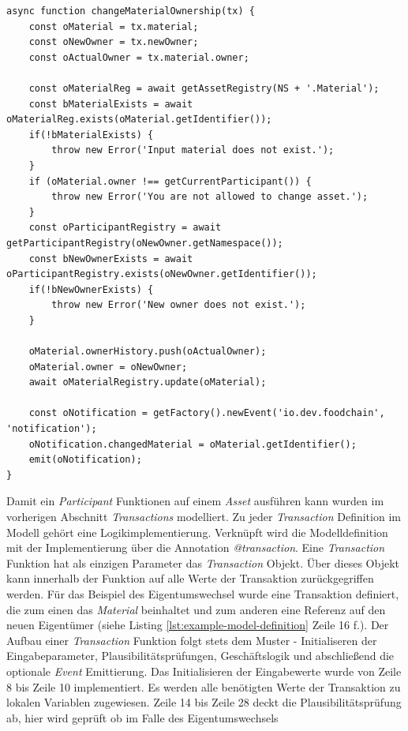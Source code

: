 \begin{lstlisting}[caption={Transaction Processor Function \textit{changeMaterialOwnership(tx)}},language=ES6,label=lst:transaction-logic-change-ownership]
async function changeMaterialOwnership(tx) {
    const oMaterial = tx.material;
    const oNewOwner = tx.newOwner;
    const oActualOwner = tx.material.owner;

    const oMaterialReg = await getAssetRegistry(NS + '.Material');
    const bMaterialExists = await oMaterialReg.exists(oMaterial.getIdentifier());
    if(!bMaterialExists) {
        throw new Error('Input material does not exist.');
    }
    if (oMaterial.owner !== getCurrentParticipant()) {
        throw new Error('You are not allowed to change asset.');
    }
    const oParticipantRegistry = await getParticipantRegistry(oNewOwner.getNamespace());
    const bNewOwnerExists = await oParticipantRegistry.exists(oNewOwner.getIdentifier());
    if(!bNewOwnerExists) {
        throw new Error('New owner does not exist.');
    }

    oMaterial.ownerHistory.push(oActualOwner);
    oMaterial.owner = oNewOwner;
    await oMaterialRegistry.update(oMaterial);

    const oNotification = getFactory().newEvent('io.dev.foodchain', 'notification');
    oNotification.changedMaterial = oMaterial.getIdentifier();
    emit(oNotification);
}
\end{lstlisting}

\noindent
Damit ein \textit{Participant} Funktionen auf einem \textit{Asset} ausführen kann wurden im vorherigen Abschnitt \textit{Transactions} modelliert. Zu jeder \textit{Transaction} Definition im Modell gehört eine Logikimplementierung. Verknüpft wird die Modelldefinition mit der Implementierung über die Annotation \textit{@transaction}. Eine \textit{Transaction} Funktion hat als einzigen Parameter das \textit{Transaction} Objekt. Über dieses Objekt kann innerhalb der Funktion auf alle Werte der Transaktion zurückgegriffen werden. Für das Beispiel des Eigentumswechsel wurde eine Transaktion definiert, die zum einen das \textit{Material} beinhaltet und zum anderen eine Referenz auf den neuen Eigentümer (siehe Listing \ref{lst:example-model-definition} Zeile 16 f.). Der Aufbau einer \textit{Transaction} Funktion folgt stets dem Muster - Initialiseren der Eingabeparameter, Plausibilitätsprüfungen, Geschäftslogik und abschließend die optionale \textit{Event} Emittierung. Das Initialisieren der Eingabewerte wurde von Zeile 8 bis Zeile 10 implementiert. Es werden alle benötigten Werte der Transaktion zu lokalen Variablen zugewiesen. Zeile 14 bis Zeile 28 deckt die Plausibilitätsprüfung ab, hier wird geprüft ob im Falle des Eigentumswechsels

